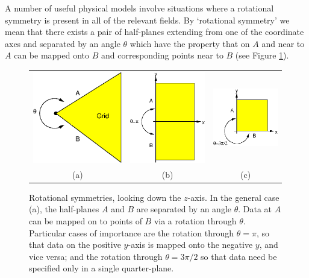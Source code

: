 \documentclass{article}
\newif\ifpdf
\begin{document}
A number of useful physical models involve situations where a
rotational symmetry is present in all of the relevant fields. By
`rotational symmetry' we mean that there exists a pair of half-planes
extending from one of the coordinate axes and separated by an angle
$\theta$ which have the property that on $A$ and near to $A$ can be
mapped onto $B$ and corresponding points near to $B$ (see Figure
\ref{fig:rs_rotation_examples}).
%
\begin{figure}
\centering
\begin{tabular}{ccc}
\ifpdf
\else
\includegraphics[height=40mm]{fig/rotate_general.eps}
\fi
&
\ifpdf
\else
\includegraphics[height=40mm]{fig/rotate_bitant.eps}
\fi
&
\ifpdf
\else
\includegraphics[height=25mm]{fig/rotate_octant.eps}
\fi
\\
(a) & (b) & (c)
\end{tabular}
\caption{Rotational symmetries, looking down the $z$-axis. In the
general case (a), the half-planes $A$ and $B$ are separated by an
angle $\theta$. Data at $A$ can be mapped on to points of $B$ via a
rotation through $\theta$. Particular cases of importance are the
rotation through $\theta=\pi$, so that data on the positive $y$-axis
is mapped onto the negative $y$, and vice versa; and the rotation
through $\theta=3\pi/2$ so that data need be specified only in a
single quarter-plane.}
\label{fig:rs_rotation_examples}
\end{figure}
\end{document}
